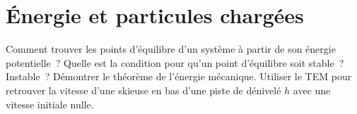\documentclass[a4paper, 10pt, final, garamond]{book}
\begin{document}
\setcounter{chapter}{16}


\chapter{Énergie et particules chargées}

\begin{enumerate}[label=\sqenumi]
	Comment trouver les points d'équilibre d'un système à partir de son énergie
	potentielle~? Quelle est la condition pour qu'un point d'équilibre soit
	stable~? Instable~?
	\smallbreak
	\psw{
		\[
			\text{Équilibre} \Lra
			\eval{\pdv{\Ec_p}{x}}_{x\ind{eq}} \stm{=} 0
			\qet \text{stable si} \eval{\pdv[2]{\Ec_p}{x}}_{x\ind{eq}} \stm{>} 0
			\quad ; \quad
			\text{instable si} \eval{\pdv[2]{\Ec_p}{x}}_{x\ind{eq}} < 0
		\]
	}
	Démontrer le théorème de l'énergie mécanique. Utiliser le TEM pour retrouver
	la vitesse d'une skieuse en bas d'une piste de dénivelé $h$ avec une vitesse
	initiale nulle.
	\smallbreak
	\begin{isd}
		\vspace{-15pt}
		\tcblower
		\vspace{-15pt}
	\end{isd}

\end{enumerate}
\end{document}
